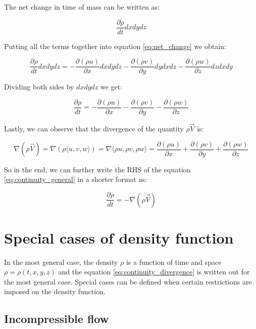 The net change in time of mass can be written as:

\begin{equation}
\frac{\partial \rho}{dt} dx dy dz
\end{equation}

Putting all the terms together into equation \ref{eq:net_change} we obtain:

\begin{equation}
\frac{\partial \rho}{dt} dx dy dz = - \frac{\partial (\rho u)}{\partial x} dx dy dz - \frac{\partial (\rho v)}{\partial y} dy dx dz - \frac{\partial (\rho w)}{\partial z} dz dx dy
\end{equation}

Dividing both sides by $dx dy dz$ we get:

\begin{equation} \label{eq:continuity_general}
\frac{\partial \rho}{dt} = - \frac{\partial (\rho u)}{\partial x} - \frac{\partial (\rho v)}{\partial y} - \frac{\partial (\rho w)}{\partial z}
\end{equation}

Lastly, we can observe that the divergence of the quantity $\rho \vec{V}$ is:

\begin{equation}
\nabla (\rho \vec{V}) = \nabla (\rho \langle u, v, w \rangle) = \nabla \langle \rho u, \rho v, \rho w \rangle = \frac{\partial (\rho u)}{\partial x} + \frac{\partial (\rho v)}{\partial y} + \frac{\partial (\rho w)}{\partial z}
\end{equation}

So in the end, we can further write the RHS of the equation \ref{eq:continuity_general} in a shorter format as:

\begin{equation} \label{eq:continuity_divergence}
\frac{\partial \rho}{dt} = - \nabla (\rho \vec{V})
\end{equation}

\section{Special cases of density function}

In the most general case, the density $\rho$ is a function of time and space $\rho = \rho(t, x, y, z)$ and the equation \ref{eq:continuity_divergence} is written out for the most general case. Special cases can be defined when certain restrictions are imposed on the density function.

\subsection{Incompressible flow}

